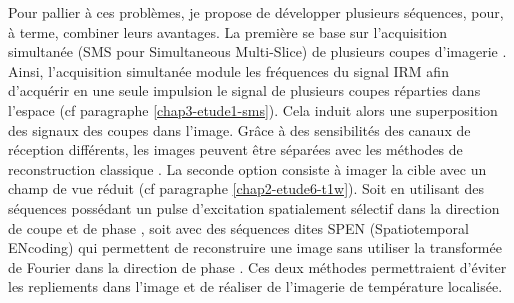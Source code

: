 Pour pallier à ces problèmes, je propose de développer plusieurs séquences, pour, à terme, combiner leurs avantages. La première se base sur l’acquisition simultanée (SMS pour Simultaneous Multi-Slice) de plusieurs coupes d’imagerie \cite{larkman2001investigation,setsompop2012blipped}. Ainsi, l’acquisition simultanée module les fréquences du signal IRM afin d’acquérir en une seule impulsion le signal de plusieurs coupes réparties dans l’espace (cf paragraphe \ref{chap3-etude1-sms}). Cela induit alors une superposition des signaux des coupes dans l’image. Grâce à des sensibilités des canaux de réception différents, les images peuvent être séparées avec les méthodes de reconstruction classique \cite{breuer2005controlled}. La seconde option consiste à imager la cible avec un champ de vue réduit (cf paragraphe \ref{chap2-etude6-t1w}). Soit en utilisant des séquences possédant un pulse d’excitation spatialement sélectif dans la direction de coupe et de phase \cite{saritas2008dwi}, soit avec des séquences dites SPEN (Spatiotemporal ENcoding) qui permettent de reconstruire une image sans utiliser la transformée de Fourier dans la direction de phase \cite{ben2010super}. Ces deux méthodes permettraient d’éviter les repliements dans l’image et de réaliser de l’imagerie de température localisée.\\